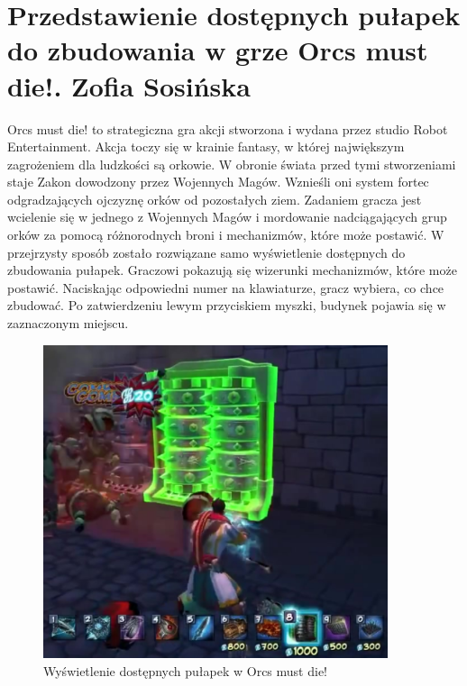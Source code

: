 \section{Przedstawienie dostępnych pułapek do zbudowania w grze Orcs must die!. Zofia Sosińska}\label{chap:omd}

Orcs must die! to strategiczna gra akcji stworzona i wydana przez studio Robot Entertainment. Akcja toczy się w krainie fantasy, w której największym zagrożeniem dla ludzkości są orkowie. W obronie świata przed tymi stworzeniami staje Zakon dowodzony przez Wojennych Magów. Wznieśli oni system fortec odgradzających ojczyznę orków od pozostałych ziem. Zadaniem gracza jest wcielenie się w jednego z  Wojennych Magów i mordowanie nadciągających grup orków za pomocą różnorodnych broni i mechanizmów, które może postawić.
W przejrzysty sposób zostało rozwiązane samo wyświetlenie dostępnych do zbudowania pułapek. Graczowi pokazują się wizerunki mechanizmów, które może postawić. Naciskając odpowiedni numer na klawiaturze, gracz wybiera, co chce zbudować. Po zatwierdzeniu lewym przyciskiem myszki, budynek pojawia się w zaznaczonym miejscu.

\begin{figure}[h!tbp]
    \centering
    \includegraphics[width=0.9\textwidth]{images/ui/buoildingsOrcs.png}
    \caption{Wyświetlenie dostępnych pułapek w Orcs must die!}\label{fig:Orcs}
\end{figure}
